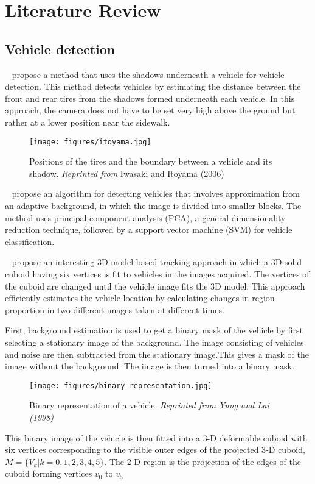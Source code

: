 \documentclass[a4paper]{aitthesis}
\begin{document}
%
\chapter{Literature Review} \label{literature}


\section{Vehicle detection}

~ propose a method that uses the shadows underneath a vehicle for vehicle detection. This method detects vehicles by estimating the distance between the front and rear tires from the shadows formed underneath each vehicle. In this approach, the camera does not have to be set very high above the ground but rather at a lower position near the sidewalk. 
\begin{figure}[h]
    \centering
    \texttt{[image: figures/itoyama.jpg]}
    \caption{Positions of the tires and the boundary between a vehicle and its shadow. 
    	\emph {Reprinted from} Iwasaki and Itoyama (2006)} 
    \label{fig:cap1}
\end{figure}

~\noindent{} propose an algorithm for detecting vehicles that involves approximation from an adaptive background, in which the image is divided into smaller blocks. The method uses principal component analysis (PCA), a general dimensionality reduction technique, followed by a support vector machine (SVM) for vehicle classification. 

~\noindent{} propose an interesting 3D model-based tracking approach in which a 3D solid cuboid having six vertices is fit to vehicles in the images acquired. The vertices of the cuboid are changed  until the vehicle image fits the 3D model. This approach efficiently estimates the vehicle location by calculating changes in region proportion in two different images taken at different times. 

\indent First, background estimation is used to get a binary mask of the vehicle by first selecting a stationary image of the background. The image consisting of vehicles and noise are then subtracted from the stationary image.This gives a mask of the image without the background. The image is then turned into a binary mask.
\begin{figure}[h]
    \centering
    \texttt{[image: figures/binary\_representation.jpg]}
    \caption{Binary representation of a vehicle. 
     \emph{ Reprinted from Yung and Lai (1998)}}
    \label{fig:cap1}
\end{figure}
\newline
 This binary image of the vehicle is then fitted into a 3-D deformable cuboid with six vertices corresponding to the visible outer edges of the projected 3-D cuboid, $ M = \{V_k| k = 0, 1, 2, 3, 4, 5\} $. The 2-D region is the projection of the edges of the cuboid forming vertices $v_0$ to $v_5$
\end{document}

